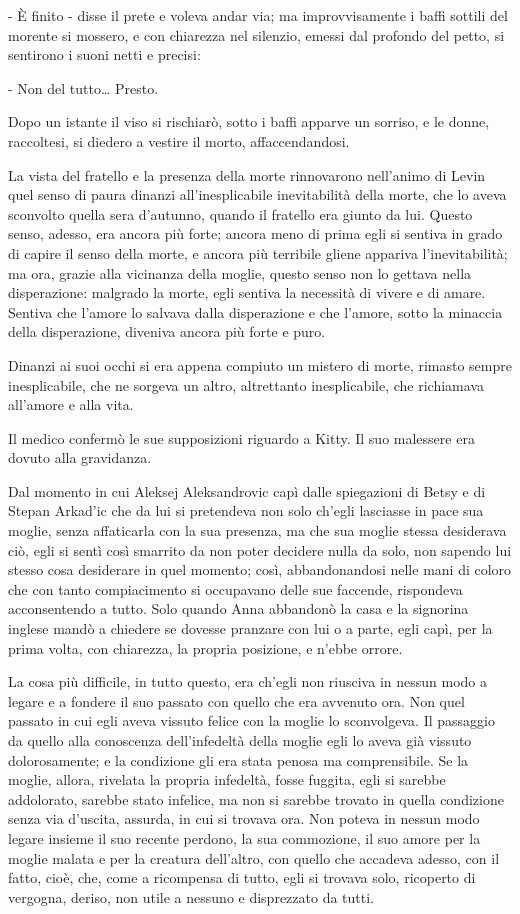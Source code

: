 - È finito - disse il prete e voleva andar via; ma improvvisamente i baffi sottili del morente si mossero, e con chiarezza nel silenzio, emessi dal profondo del petto, si sentirono i suoni netti e precisi: 

- Non del tutto\ldots{} Presto. 

Dopo un istante il viso si rischiarò, sotto i baffi apparve un sorriso, e le donne, raccoltesi, si diedero a vestire il morto, affaccendandosi. 

La vista del fratello e la presenza della morte rinnovarono nell'animo di Levin quel senso di paura dinanzi all'inesplicabile inevitabilità della morte, che lo aveva sconvolto quella sera d'autunno, quando il fratello era giunto da lui. Questo senso, adesso, era ancora più forte; ancora meno di prima egli si sentiva in grado di capire il senso della morte, e ancora più terribile gliene appariva l'inevitabilità; ma ora, grazie alla vicinanza della moglie, questo senso non lo gettava nella disperazione: malgrado la morte, egli sentiva la necessità di vivere e di amare. Sentiva che l'amore lo salvava dalla disperazione e che l'amore, sotto la minaccia della disperazione, diveniva ancora più forte e puro. 

Dinanzi ai suoi occhi si era appena compiuto un mistero di morte, rimasto sempre inesplicabile, che ne sorgeva un altro, altrettanto inesplicabile, che richiamava all'amore e alla vita. 

Il medico confermò le sue supposizioni riguardo a Kitty. Il suo malessere era dovuto alla gravidanza. 

Dal momento in cui Aleksej Aleksandrovic capì dalle spiegazioni di Betsy e di Stepan Arkad'ic che da lui si pretendeva non solo ch'egli lasciasse in pace sua moglie, senza affaticarla con la sua presenza, ma che sua moglie stessa desiderava ciò, egli si sentì così smarrito da non poter decidere nulla da solo, non sapendo lui stesso cosa desiderare in quel momento; così, abbandonandosi nelle mani di coloro che con tanto compiacimento si occupavano delle sue faccende, rispondeva acconsentendo a tutto. Solo quando Anna abbandonò la casa e la signorina inglese mandò a chiedere se dovesse pranzare con lui o a parte, egli capì, per la prima volta, con chiarezza, la propria posizione, e n'ebbe orrore. 

La cosa più difficile, in tutto questo, era ch'egli non riusciva in nessun modo a legare e a fondere il suo passato con quello che era avvenuto ora. Non quel passato in cui egli aveva vissuto felice con la moglie lo sconvolgeva. Il passaggio da quello alla conoscenza dell'infedeltà della moglie egli lo aveva già vissuto dolorosamente; e la condizione gli era stata penosa ma comprensibile. Se la moglie, allora, rivelata la propria infedeltà, fosse fuggita, egli si sarebbe addolorato, sarebbe stato infelice, ma non si sarebbe trovato in quella condizione senza via d'uscita, assurda, in cui si trovava ora. Non poteva in nessun modo legare insieme il suo recente perdono, la sua commozione, il suo amore per la moglie malata e per la creatura dell'altro, con quello che accadeva adesso, con il fatto, cioè, che, come a ricompensa di tutto, egli si trovava solo, ricoperto di vergogna, deriso, non utile a nessuno e disprezzato da tutti. 

